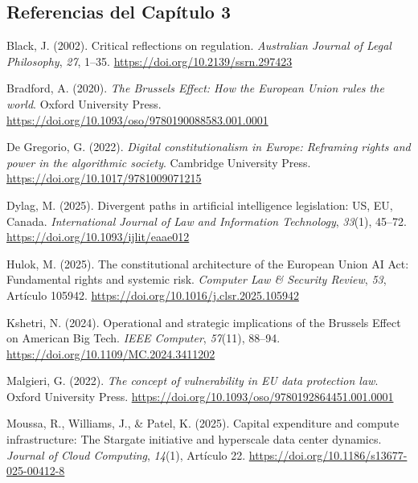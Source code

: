 \newpage
{}

\subsection*{Referencias del Capítulo 3}

\begin{list}{}{\setlength{\leftmargin}{1.5em}\setlength{\itemindent}{-1.5em}\setlength{\itemsep}{0.35ex}\setlength{\parsep}{0pt}}
\small\raggedright
{}
\item Black, J. (2002). Critical reflections on regulation. \textit{Australian Journal of Legal Philosophy}, \textit{27}, 1--35. \url{https://doi.org/10.2139/ssrn.297423}

\item Bradford, A. (2020). \textit{The Brussels Effect: How the European Union rules the world}. Oxford University Press. \url{https://doi.org/10.1093/oso/9780190088583.001.0001}

\item De Gregorio, G. (2022). \textit{Digital constitutionalism in Europe: Reframing rights and power in the algorithmic society}. Cambridge University Press. \url{https://doi.org/10.1017/9781009071215}

\item Dylag, M. (2025). Divergent paths in artificial intelligence legislation: US, EU, Canada. \textit{International Journal of Law and Information Technology}, \textit{33}(1), 45--72. \url{https://doi.org/10.1093/ijlit/eaae012}

\item Hulok, M. (2025). The constitutional architecture of the European Union AI Act: Fundamental rights and systemic risk. \textit{Computer Law \& Security Review}, \textit{53}, Artículo 105942. \url{https://doi.org/10.1016/j.clsr.2025.105942}

\item Kshetri, N. (2024). Operational and strategic implications of the Brussels Effect on American Big Tech. \textit{IEEE Computer}, \textit{57}(11), 88--94. \url{https://doi.org/10.1109/MC.2024.3411202}

\item Malgieri, G. (2022). \textit{The concept of vulnerability in EU data protection law}. Oxford University Press. \url{https://doi.org/10.1093/oso/9780192864451.001.0001}

\item Moussa, R., Williams, J., \& Patel, K. (2025). Capital expenditure and compute infrastructure: The Stargate initiative and hyperscale data center dynamics. \textit{Journal of Cloud Computing}, \textit{14}(1), Artículo 22. \url{https://doi.org/10.1186/s13677-025-00412-8}


\end{list}

